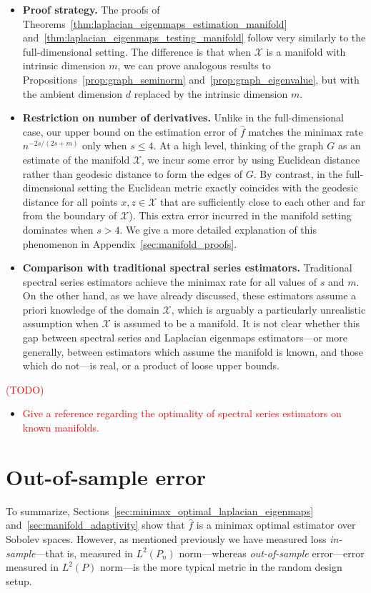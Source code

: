 \documentclass{article}
\newcommand{\1}{\mathbf{1}}
\newcommand{\Leb}{L}
\newcommand{\mc}[1]{\mathcal{#1}}
\newcommand{\wh}[1]{\widehat{#1}}
\theoremstyle{alden}
\theoremstyle{aldenthm}
\theoremstyle{definition}
\theoremstyle{remark}
\begin{document}
\begin{itemize}
	\item \textbf{Proof strategy.} The proofs of Theorems~\ref{thm:laplacian_eigenmaps_estimation_manifold} and~\ref{thm:laplacian_eigenmaps_testing_manifold} follow very similarly to the full-dimensional setting. The difference is that when $\mc{X}$ is a manifold with intrinsic dimension $m$, we can prove analogous results to Propositions~\ref{prop:graph_seminorm} and~\ref{prop:graph_eigenvalue}, but with the ambient dimension $d$ replaced by the intrinsic dimension $m$. 
	\item \textbf{Restriction on number of derivatives.} Unlike in the full-dimensional case, our upper bound on the estimation error of $\wh{f}$ matches the minimax rate $n^{-2s/(2s + m)}$ only when $s \leq 4$. At a high level, thinking of the graph $G$ as an estimate of the manifold $\mc{X}$, we incur some error by using Euclidean distance rather than geodesic distance to form the edges of $G$. By contrast, in the full-dimensional setting the Euclidean metric exactly coincides with the geodesic distance for all points $x,z \in \mc{X}$ that are sufficiently close to each other and far from the boundary of $\mc{X}$). This extra error incurred in the manifold setting dominates when $s > 4$. We give a more detailed explanation of this phenomenon in Appendix~\ref{sec:manifold_proofs}.
	\item \textbf{Comparison with traditional spectral series estimators.} Traditional spectral series estimators achieve the minimax rate for all values of $s$ and $m$. On the other hand, as we have already discussed, these estimators assume a priori knowledge of the domain $\mc{X}$, which is arguably a particularly unrealistic assumption when $\mc{X}$ is assumed to be a manifold. It is not clear whether this gap between spectral series and Laplacian eigenmaps estimators---or more generally, between estimators which assume the manifold is known, and those which do not---is real, or a product of loose upper bounds. 
\end{itemize}

\textcolor{red}{(TODO)}
\begin{itemize}
	\item \textcolor{red}{Give a reference regarding the optimality of spectral series estimators on known manifolds.}
\end{itemize}

\section{Out-of-sample error}
\label{sec:out_of_sample}
To summarize, Sections~\ref{sec:minimax_optimal_laplacian_eigenmaps} and~\ref{sec:manifold_adaptivity} show that $\wh{f}$ is a minimax optimal estimator over Sobolev spaces. However, as mentioned previously we have measured loss \emph{in-sample}---that is, measured in $\Leb^2(P_n)$ norm---whereas \emph{out-of-sample} error---error measured in $L^2(P)$ norm---is the more typical metric in the random design setup.
\end{document}
